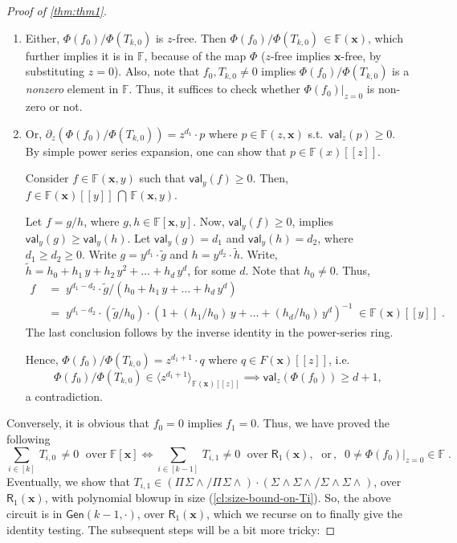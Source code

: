 \documentclass[10pt,a4paper]{article}
\newcommand{\F}{\mathbb{F}}
\newcommand{\ringR}{\mathsf{R}}
\newcommand{\x}{{\boldsymbol x}}
\newcommand{\val}{\mathsf{val}}
\newcommand{\PSU}[2]{\Pi^{#1} \Sigma\wedge^{#2}}
\newcommand{\SWSU}[2]{\Sigma^{#1}\!\wedge\!\Sigma\!\wedge^{#2}}
\newcommand{\Gen}[2]{\mathsf{Gen}(#1,#2)}
\numberwithin{equation}{section}
\newenvironment{proof-sketch}{\medskip\noindent{\em Proof Sketch.}}{\qed\bigskip}
\begin{document}
\begin{proof}[Proof of \autoref{thm:thm1}]
\begin{enumerate}
    \setlength\itemsep{1em}
    \item Either, $\Phi(f_0)/\Phi(T_{k,0})$ is $z$-free. Then $\Phi(f_0)/\Phi(T_{k,0}) \,\in \F(\x)$, which further implies it is in $\F$, because of the map $\Phi$ ($z$-free implies $\x$-free, by substituting $z=0$). Also, note that $f_0, T_{k,0} \ne 0$ implies $\Phi(f_0)/\Phi(T_{k,0})$ is a \emph{nonzero} element in $\F$. Thus, it suffices to check whether  $\Phi(f_0)\rvert_{z=0}$ is non-zero or not. 
%
    \item Or, $\partial_{z}(\Phi(f_0)/\Phi(T_{k,0}))= z^{d_1} \cdot p$ where $p \in \F(z,\x)$ s.t.~$\val_{z}(p) \ge 0$. By simple power series expansion, one can show that $p \in \F(x)[[z]]$. 
    
    \begin{lemma}[Valuation]\label{lem:val-powerseries}
        Consider $f \in \F(\x,y)$ such that $\val_{y}(f) \ge 0$. Then, $f \in \F(\x)[[y]]\,\bigcap\,\F(\x,y)$.
    \end{lemma}
    \begin{proof-sketch}
        Let $f=g/h$, where $g,h \in \F[\x,y]$. Now, $\val_{y}(f) \ge 0$, implies $\val_y(g) \ge \val_y(h)$. Let $\val_{y}(g)=d_1$ and $\val_{y}(h)=d_2$, where $d_1 \ge d_2 \ge 0$. Write $g=y^{d_1}\cdot \tilde{g}$ and $h=y^{d_2}\cdot \tilde{h}$. Write, $\tilde{h}= h_0+h_1\,y+h_2\,y^2+\hdots + h_d\,y^d$, for some $d$. Note that $h_0 \ne 0$. Thus, 
        \begin{align*}
            f&\;=\; y^{d_1-d_2} \cdot \tilde{g}/(h_0+h_1\,y+\hdots+h_d\,y^d) \\ &\;=\;y^{d_1-d_2} \cdot (\tilde{g}/h_0) \cdot (1+(h_1/h_0)\,y+\hdots + (h_d/h_0)\,y^d)^{-1}\; \in \F(\x)[[y]]\;.
        \end{align*}
        The last conclusion follows by the inverse identity in the power-series ring.
    \end{proof-sketch}

    Hence, $\Phi(f_0)/\Phi(T_{k,0}) = z^{d_1+1} \cdot q$ where $q \in F(\x)[[z]]$, i.e. \[\Phi(f_0)/\Phi(T_{k,0}) \in \langle z^{d_1+1}\rangle_{\F(\x)[[z]]} \implies \val_{z}(\Phi(f_0)) \ge d+1,\] a contradiction.
\end{enumerate}

\noindent Conversely, it is obvious that $f_0=0$ implies $f_1=0$. Thus, we have proved the following 
\[ \sum_{i \in [k]}\,T_{i,0}\,\ne 0 \;\text{ over}\;\F[\x] \iff \sum_{i \in [k-1]}\, T_{i,1} \ne 0 \;\text{ over} \;\ringR_1(\x),\;\text{ or}\,,\;\;0 \ne \Phi(f_0) \rvert_{z=0} \in \F\;.\]
 Eventually, we show that $T_{i,1} \in (\PSU{}{}/\PSU{}{}) \cdot (\SWSU{}{}/\SWSU{}{})$, over $\ringR_1(\x)$, with polynomial blowup in size (\autoref{cl:size-bound-on-Ti}). So, the above circuit is in $\Gen{k-1}{\cdot}$, over $\ringR_1(\x)$, which we recurse on to finally give the identity testing. The subsequent steps will be a bit more tricky:


\end{proof}
\end{document}
